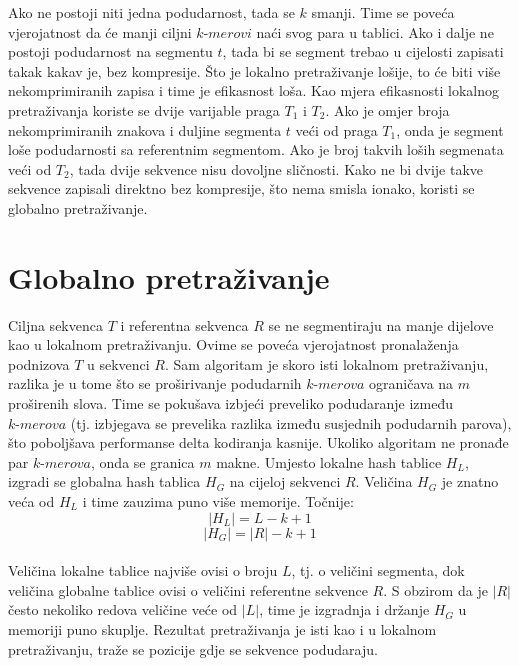 \documentclass[times, utf8, diplomski]{fer}
\begin{document}
Ako ne postoji niti jedna podudarnost, tada se $k$ smanji. Time se poveća vjerojatnost da će manji ciljni $\textit{k-merovi}$ naći svog para u tablici. Ako i dalje ne postoji podudarnost na segmentu $t$, tada bi se segment trebao u cijelosti zapisati takak kakav je, bez kompresije. Što je lokalno pretraživanje lošije, to će biti više nekomprimiranih zapisa i time je efikasnost loša. Kao mjera efikasnosti lokalnog pretraživanja koriste se dvije varijable praga $T_1$ i $T_2$. Ako je omjer broja nekomprimiranih znakova i duljine segmenta $t$ veći od praga $T_1$, onda je segment loše podudarnosti sa referentnim segmentom. Ako je broj takvih loših segmenata veći od $T_2$, tada dvije sekvence nisu dovoljne sličnosti. Kako ne bi dvije takve sekvence zapisali direktno bez kompresije, što nema smisla ionako, koristi se globalno pretraživanje.

\section{Globalno pretraživanje}
Ciljna sekvenca $\textit{T}$ i referentna sekvenca $\textit{R}$ se ne segmentiraju na manje dijelove kao u lokalnom pretraživanju. Ovime se poveća vjerojatnost pronalaženja podnizova $\textit{T}$ u sekvenci $\textit{R}$. Sam algoritam je skoro isti lokalnom pretraživanju, razlika je u tome što se proširivanje podudarnih $\textit{k-merova}$ ograničava na $\textit{m}$ proširenih slova. Time se pokušava izbjeći preveliko podudaranje između $\textit{k-merova}$ (tj. izbjegava se prevelika razlika između susjednih podudarnih parova), što poboljšava performanse delta kodiranja kasnije. Ukoliko algoritam ne pronađe par $\textit{k-merova}$, onda se granica $\textit{m}$ makne. Umjesto lokalne hash tablice $\textit{H}_L$, izgradi se globalna hash tablica $\textit{H}_G$ na cijeloj sekvenci $\textit{R}$. Veličina $\textit{H}_G$ je znatno veća od $\textit{H}_L$ i time zauzima puno više memorije. Točnije:\\
$$|H_L| = L - k + 1$$
$$|H_G| = |R| - k + 1$$\\
Veličina lokalne tablice najviše ovisi o broju $\textit{L}$, tj. o veličini segmenta, dok veličina globalne tablice ovisi o veličini referentne sekvence $\textit{R}$. S obzirom da je $|R|$ često nekoliko redova veličine veće od $|L|$, time je izgradnja i držanje $\textit{H}_G$ u memoriji puno skuplje.
Rezultat pretraživanja je isti kao i u lokalnom pretraživanju, traže se pozicije gdje se sekvence podudaraju.
\end{document}
